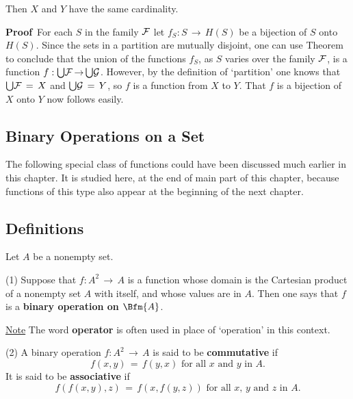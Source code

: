 {        Then $X$ and $Y$ have the same cardinality.

\V

        {\bf Proof}\,  For each $S$ in the family ${\cal F}$ let $f_{S}:S \,{\rightarrow}\, H(S)$ be a bijection of $S$ onto $H(S)$.
    Since the sets in a partition are mutually disjoint, one can use Theorem~ to conclude that the union of the functions $f_{S}$,
    as $S$ varies over the family ${\cal F}$, is a function $f:{\bigcup} {\cal F} \,{\rightarrow}\, {\bigcup} {\cal G}$.
    However, by the definition of `partition' one knows that ${\bigcup} {\cal F} \,=\, X$ and ${\bigcup} {\cal G} \,=\, Y$, so $f$ is a function from $X$ to $Y$.
    That $f$ is a bijection of $X$ onto $Y$ now follows easily.



\VV

        \subsection{\small{{\bf Binary Operations on a Set}}}
        \label{SectA60}

        The following special class of functions could have been discussed much earlier in this chapter.
    It is studied here, at the end of main part of this chapter, because functions of this type also appear at the beginning of the next chapter.


        \subsection{\small{{\bf Definitions}}}
        \label{DefA60.10}

        Let $A$ be a nonempty set.

\V

        (1) Suppose that $f:A^{2} \,{\rightarrow}\, A$ is a function whose domain is the Cartesian product of a nonempty set $A$ with itself,
    and whose values are in $A$. Then one says that $f$ is a
    {\bf binary operation on $\Bfm{A}$}.

        \underline{Note} The word {\bf operator} is often used in place of `operation' in this context.


\V

        (2) A binary operation $f:A^{2} \,{\rightarrow}\, A$ is said to be {\bf commutative} if
        \begin{displaymath}
        f(x,y) \,=\, f(y,x) \mbox{ for all $x$ and $y$ in $A$}.
        \end{displaymath}
    It is said to be {\bf associative} if
        \begin{displaymath}
        f(f(x,y),z) \,=\, f(x,f(y,z)) \mbox{ for all $x$, $y$ and $z$ in $A$}.
        \end{displaymath}

}
